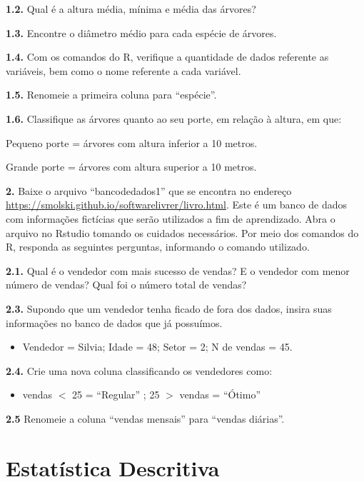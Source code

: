 \documentclass[12pt,brazil,oneside]{book}
\providecommand{\tightlist}{%
  \setlength{\itemsep}{0pt}\setlength{\parskip}{0pt}}
\begin{document}
\textbf{1.2.} Qual é a altura média, mínima e média das árvores?

\textbf{1.3.} Encontre o diâmetro médio para cada espécie de árvores.

\textbf{1.4.} Com os comandos do R, verifique a quantidade de dados referente as variáveis, bem como o nome referente a cada variável.

\textbf{1.5.} Renomeie a primeira coluna para ``espécie''.

\textbf{1.6.} Classifique as árvores quanto ao seu porte, em relação à altura, em que:

Pequeno porte = árvores com altura inferior a 10 metros.

Grande porte = árvores com altura superior a 10 metros.

\textbf{2.} Baixe o arquivo ``bancodedados1'' que se encontra no endereço \url{https://smolski.github.io/softwarelivrer/livro.html}. Este é um banco de dados com informações fictícias que serão utilizados a fim de aprendizado. Abra o arquivo no Rstudio tomando os cuidados necessários. Por meio dos comandos do R, responda as seguintes perguntas, informando o comando utilizado.

\textbf{2.1.} Qual é o vendedor com mais sucesso de vendas? E o vendedor com menor número de vendas?
Qual foi o número total de vendas?

\textbf{2.3.} Supondo que um vendedor tenha ficado de fora dos dados, insira suas informações no banco de dados que já possuímos.

\begin{itemize}
\tightlist
\item
  Vendedor = Silvia; Idade = 48; Setor = 2; N de vendas = 45.
\end{itemize}

\textbf{2.4.} Crie uma nova coluna classificando os vendedores como:

\begin{itemize}
\tightlist
\item
  vendas \(<\) 25 = ``Regular'' ; 25 \(>\) vendas = ``Ótimo''
\end{itemize}

\textbf{2.5} Renomeie a coluna ``vendas mensais'' para ``vendas diárias''.

\hypertarget{desc}{%
\chapter{Estatística Descritiva}\label{desc}}
\end{document}
